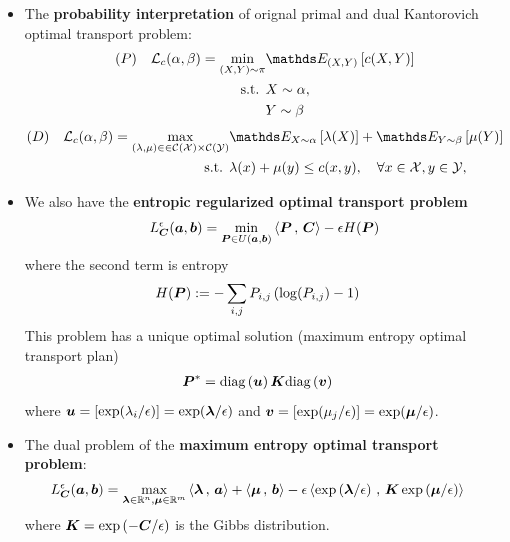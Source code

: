 \documentclass[11pt]{article}
\begin{document}
\begin{itemize}
\item The \textbf{probability interpretation} of orignal primal and dual Kantorovich optimal transport problem: 
\begin{align}
(P)\quad \cL_{c}(\alpha, \beta) = \min_{(X, Y) \sim \pi}& \E{(X,Y)}{c(X, Y)}   \label{eqn: optimal_transport_prob} \\
\text{s.t. }&  X \sim \alpha,  \nonumber \\
& Y\sim \beta  \nonumber
\end{align}
\begin{align}
(D)\quad \cL_{c}(\alpha, \beta) = \max_{(\lambda,  \mu) \in \in \cC(\cX)\times \cC(\cY)} & \E{X\sim \alpha}{\lambda(X)} + \E{Y \sim \beta}{\mu(Y)} \label{eqn: optimal_transport_dual_prob} \\
\text{s.t. }&  \lambda(x) + \mu(y) \le c(x, y),\quad \forall x\in \cX, y \in \cY, \nonumber
\end{align}

\item We also have the \textbf{entropic regularized optimal transport problem} 
\begin{align}
L_{\boldsymbol{C}}^{\epsilon}(\boldsymbol{a}, \boldsymbol{b}) = \min_{\boldsymbol{P} \in U(\boldsymbol{a}, \boldsymbol{b})} \left\langle \boldsymbol{P}\,,\, \boldsymbol{C} \right\rangle - \epsilon H(\boldsymbol{P}) \label{eqn: optimal_transport_primal_entropy_reg}
\end{align} where the second term is entropy 
\begin{align}
H(\boldsymbol{P}) &:= -\sum_{i,j}P_{i,j}\left(\log(P_{i,j}) - 1\right) \label{eqn: entropy_regularization}
\end{align} This problem has a unique optimal solution (maximum entropy optimal transport plan) 
\begin{align}
\boldsymbol{P}^{*} &= \text{diag}\left(\boldsymbol{u}\right)\boldsymbol{K}\text{diag}\left(\boldsymbol{v}\right)  \label{eqn: optimal_transport_primal_kl_sol2}
\end{align} where  $\boldsymbol{u} = [\exp(\lambda_i / \epsilon)] = \exp(\boldsymbol{\lambda}/\epsilon)$ and $\boldsymbol{v} =  [\exp(\mu_j / \epsilon)] = \exp(\boldsymbol{\mu}/\epsilon)$.

\item The dual problem of the \textbf{maximum entropy optimal transport problem}:
\begin{align}
L_{\boldsymbol{C}}^{\epsilon}(\boldsymbol{a}, \boldsymbol{b}) = \max_{\boldsymbol{\lambda} \in {\mathbb R}^{n}, \boldsymbol{\mu} \in {\mathbb R}^{m}}& \left\langle \boldsymbol{\lambda}\,,\, \boldsymbol{a} \right\rangle + \left\langle \boldsymbol{\mu}\,,\, \boldsymbol{b} \right\rangle - \epsilon \left\langle \exp\left(\boldsymbol{\lambda}/\epsilon\right)\,,\, \boldsymbol{K}\exp\left(\boldsymbol{\mu}/\epsilon\right) \right\rangle \label{eqn: optimal_transport_dual_entropy_reg}
\end{align} where $\boldsymbol{K} = \exp\left(-\boldsymbol{C}/\epsilon\right)$ is the Gibbs distribution. 




\end{itemize}
\end{document}
